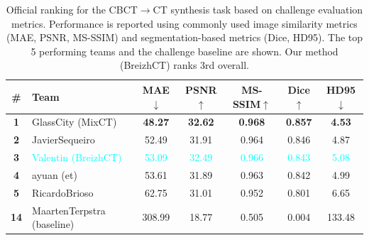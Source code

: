 \begin{table}[h!]
\centering
\scriptsize
\renewcommand{\arraystretch}{1}
\setlength{\tabcolsep}{5pt}
\caption{
Official ranking for the CBCT$\rightarrow$CT synthesis task based on challenge evaluation metrics. Performance is reported using commonly used image similarity metrics (MAE, PSNR, MS-SSIM) and segmentation-based metrics (Dice, HD95). The top 5 performing teams and the challenge baseline are shown. Our method (BreizhCT) ranks 3rd overall.
}
\label{tab:cbctct_image}
\begin{tabular}{clccccc}
\toprule
\textbf{\#} & \textbf{Team} & \textbf{MAE$\downarrow$} & \textbf{PSNR$\uparrow$} & \textbf{MS-SSIM$\uparrow$} & \textbf{Dice$\uparrow$} & \textbf{HD95$\downarrow$} \\
\midrule
\textbf{1} & GlassCity (MixCT)         & \textbf{48.27}  & \textbf{32.62} & \textbf{0.968} & \textbf{0.857} & \textbf{4.53} \\
\textbf{2} & JavierSequeiro            & 52.49  & 31.91 & 0.964 & 0.846 & 4.87 \\
\textbf{3} & \textcolor{cyan}{Valentin (BreizhCT)} 
& \textcolor{cyan}{53.09}  & \textcolor{cyan}{32.49} & \textcolor{cyan}{0.966} & \textcolor{cyan}{0.843} & \textcolor{cyan}{5.08} \\
\textbf{4} & ayuan (et)                & 53.61  & 31.89 & 0.963 & 0.842 & 4.99 \\
\textbf{5} & RicardoBrioso             & 62.75  & 31.01 & 0.952 & 0.801 & 6.65 \\
\midrule
\textbf{14} & MaartenTerpstra (baseline) & 308.99 & 18.77 & 0.505 & 0.004 & 133.48 \\
\bottomrule
\end{tabular}

\end{table}
